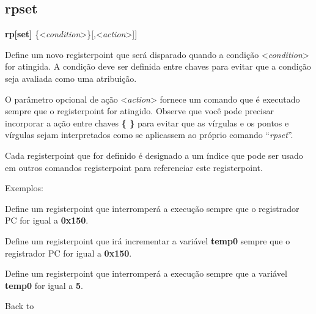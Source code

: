 \documentclass[letterpaper,10pt,brazil]{sphinxmanual}
\begin{document}
\subsection{rpset}
\label{debugger/registerpoints:debugger-command-rpset}\label{debugger/registerpoints:rpset}
\begin{DUlineblock}{0em}
\item[]
\begin{DUlineblock}{\DUlineblockindent}
\item[] \textbf{rp{[}set{]}} \{\textless{}\emph{condition}\textgreater{}\}{[},\textless{}\emph{action}\textgreater{}{]}{]}
\item[] 
\end{DUlineblock}
\item[] Define um novo registerpoint que será disparado quando a condição \textless{}\emph{condition}\textgreater{} for atingida. A condição deve ser definida entre chaves para evitar que a condição seja avaliada como uma atribuição.
\item[] O parâmetro opcional de ação \textless{}\emph{action}\textgreater{} fornece um comando que é executado sempre que o registerpoint for atingido. Observe que você pode precisar incorporar a ação entre chaves \textbf{\{ \}} para evitar que as vírgulas e os pontos e vírgulas sejam interpretados como se aplicassem ao próprio comando ``\emph{rpset}''.
\item[] Cada registerpoint que for definido é designado a um índice que pode ser usado em outros comandos registerpoint para referenciar este registerpoint.
\item[] 
\item[] Exemplos:
\item[] 
\item[]
\begin{DUlineblock}{\DUlineblockindent}
\item[] 
\item[] 
\end{DUlineblock}
\item[] Define um registerpoint que interromperá a execução sempre que o registrador PC for igual a \textbf{0x150}.
\item[] 
\item[]
\begin{DUlineblock}{\DUlineblockindent}
\item[] 
\item[] 
\end{DUlineblock}
\item[] Define um registerpoint que irá incrementar a variável \textbf{temp0} sempre que o registrador PC for igual a \textbf{0x150}.
\item[] Define um registerpoint que interromperá a execução sempre que a variável \textbf{temp0} for igual a \textbf{5}.
\item[] 
\item[] Back to {\hyperref[debugger/registerpoints:debugger\string-registerpoints\string-list]{}}
\end{DUlineblock}
\end{document}
